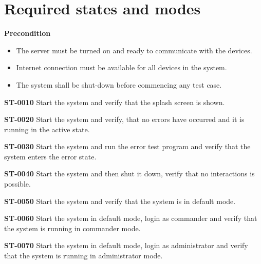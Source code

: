 \section{Required states and modes}
\textbf{Precondition}
\begin{itemize}
\item The server must be turned on and ready to communicate with the devices.
\item Internet connection must be available for all devices in the system.
\item The system shall be shut-down before commencing any test case. \\
\end{itemize}


\begin{description}

\item\textbf{ST-0010} Start the system and verify that the splash screen is shown. 
\item\textbf{ST-0020} Start the system and verify, that no errors have occurred and it is running in the active state.
\item\textbf{ST-0030} Start the system and run the error test program and verify that the system enters the error state.  
\item\textbf{ST-0040} Start the system and then shut it down, verify that no interactions is possible. 
	

\item\textbf{ST-0050} Start the system and verify that the system is in default mode. 
\item\textbf{ST-0060} Start the system in default mode, login as commander and verify that the system is running in commander mode.
\item\textbf{ST-0070} Start the system in default mode, login as administrator and verify that the system is running in administrator mode.

\end{description}
